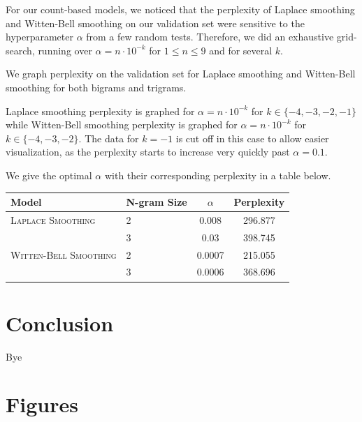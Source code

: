 \documentclass[11pt]{article}
\begin{document}
For our count-based models, we noticed that the perplexity of Laplace smoothing and Witten-Bell smoothing on our validation set were sensitive to the hyperparameter $\alpha$ from a few random tests. Therefore, we did an exhaustive grid-search, running over $\alpha = n \cdot 10^{-k}$ for $1 \leq n \leq 9$ and for several $k$. 

We graph perplexity on the validation set for Laplace smoothing and Witten-Bell smoothing for both bigrams and trigrams. 

Laplace smoothing perplexity is graphed for $\alpha = n \cdot 10^{-k}$ for $k \in \{-4, -3, -2, -1\}$ while Witten-Bell smoothing perplexity is graphed for $\alpha = n \cdot 10^{-k}$ for $k \in \{-4, -3, -2\}$. The data for $k = -1$ is cut off in this case to allow easier visualization, as the perplexity starts to increase very quickly past $\alpha = 0.1$.  

We give the optimal $\alpha$ with their corresponding perplexity in a table below. 

\begin{table}[h]
  \centering
  \begin{tabular}{llcc}
    \toprule
    Model & N-gram Size & $\alpha$ & Perplexity \\
    \midrule
    \textsc{Laplace Smoothing} & 2 & 0.008 & 296.877 \\
    & 3 & 0.03 & 398.745 \\
    \textsc{Witten-Bell Smoothing} & 2 & 0.0007 & 215.055 \\
    & 3 & 0.0006 & 368.696 \\
    \bottomrule
  \end{tabular}
  \label{tab:alpha}
\end{table}



\section{Conclusion}

Bye



\appendix

\section{Figures} 
\end{document}
